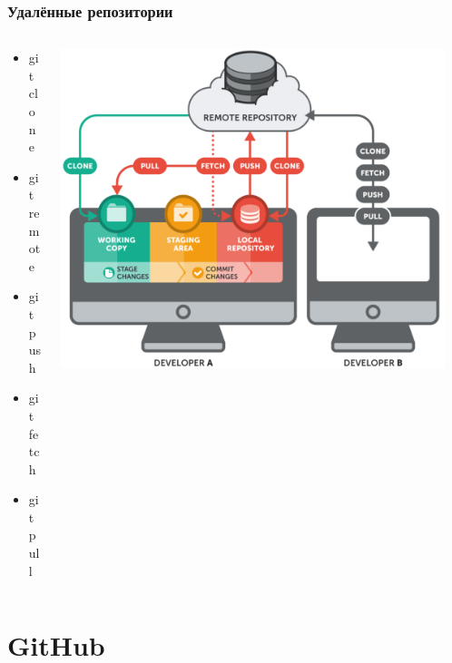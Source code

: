 \documentclass{../slides-style}
\begin{document}
    \begin{frame}
        \frametitle{Удалённые репозитории}
        \begin{columns}
            \begin{column}{0.4\textwidth}
                \begin{itemize}
                    \item git clone
                    \item git remote
                    \item git push
                    \item git fetch
                    \item git pull
                \end{itemize}
            \end{column}
            \begin{column}{0.6\textwidth}
                \begin{center}
                    \includegraphics[width=0.95\textwidth]{remoteRepos.png}
                \end{center}
            \end{column}
        \end{columns}
    \end{frame}

    \section{GitHub}
\end{document}
